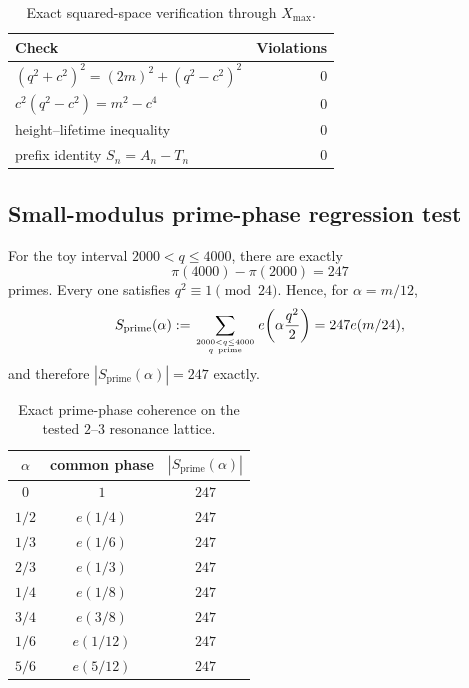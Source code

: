 \documentclass[11pt]{article}
\theoremstyle{definition}
\newcommand{\1}{\mathbf{1}}
\begin{document}
\begin{table}[htbp]
\centering
\caption{Exact squared-space verification through $X_{\max}$.}
\label{tab:exact-checks}
\small
\begin{tabular}{lr}
\toprule
Check & Violations\\
\midrule
$(q^2+c^2)^2=(2m)^2+(q^2-c^2)^2$ & 0\\
$c^2(q^2-c^2)=m^2-c^4$ & 0\\
height--lifetime inequality & 0\\
prefix identity $S_n=A_n-T_n$ & 0\\
\bottomrule
\end{tabular}
\end{table}

\subsection{Small-modulus prime-phase regression test}
\label{subsec:numerical-prime-resonance}

For the toy interval $2000<q\le4000$, there are exactly
\begin{equation}
 \pi(4000)-\pi(2000)=247
 \label{eq:toy-prime-count}
\end{equation}
primes.  Every one satisfies $q^2\equiv1\pmod{24}$.  Hence, for $\alpha=m/12$,
\begin{equation}
 S_{\mathrm{prime}}(\alpha)
 :=\sum_{2000<q\le4000\atop q\ {\rm prime}}
 e\!\left(\alpha\frac{q^2}{2}\right)
 =247e(m/24),
 \label{eq:toy-prime-resonance}
\end{equation}
and therefore $|S_{\mathrm{prime}}(\alpha)|=247$ exactly.

\begin{table}[htbp]
\centering
\caption{Exact prime-phase coherence on the tested $2$--$3$ resonance lattice.}
\label{tab:toy-prime-resonance}
\small
\begin{tabular}{ccc}
\toprule
$\alpha$ & common phase & $|S_{\mathrm{prime}}(\alpha)|$\\
\midrule
$0$ & $1$ & $247$\\
$1/2$ & $e(1/4)$ & $247$\\
$1/3$ & $e(1/6)$ & $247$\\
$2/3$ & $e(1/3)$ & $247$\\
$1/4$ & $e(1/8)$ & $247$\\
$3/4$ & $e(3/8)$ & $247$\\
$1/6$ & $e(1/12)$ & $247$\\
$5/6$ & $e(5/12)$ & $247$\\
\bottomrule
\end{tabular}
\end{table}
\end{document}
